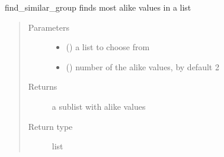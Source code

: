 \documentclass[letterpaper,10pt,english]{sphinxmanual}
\begin{document}
\begin{fulllineitems}
\label{\detokenize{helper_func:helper_func.find_similar_group}}
\sphinxAtStartPar
find\_similar\_group finds most alike values in a list
\begin{quote}\begin{description}
\item[{Parameters}] \leavevmode\begin{itemize}
\item {} 
\sphinxAtStartPar
{} () \textendash{} a list to choose from

\item {} 
\sphinxAtStartPar
{} (\sphinxstyleliteralemphasis{\sphinxupquote{, }}) \textendash{} number of the alike values, by default 2

\end{itemize}

\item[{Returns}] \leavevmode
\sphinxAtStartPar
a sublist with alike values

\item[{Return type}] \leavevmode
\sphinxAtStartPar
list

\end{description}\end{quote}

\end{fulllineitems}

\end{document}
